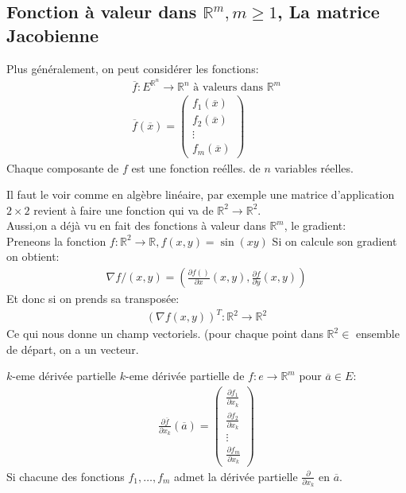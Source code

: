 \subsection{Fonction  à valeur dans $\mathbb{R}^{m}, m \geq 1$, La matrice Jacobienne}

\begin{definition}
	Plus généralement, on peut considérer les fonctions:
	\begin{align*} 
		\overline{f}: E^{\mathbb{R}^{n}} \to \mathbb{R}^{n} \text{ à valeurs dans } \mathbb{R}^{m}\\
		\overline{f}\left(\overline{x}\right) =  \begin{pmatrix} f_1\left(\overline{x}\right) \\ f_2\left(\overline{x}\right) \\ \vdots \\ f_m\left(\overline{x}\right) \end{pmatrix} 
	\end{align*}
	Chaque composante de $f$ est une fonction reélles. de $n$ variables réelles.
\end{definition}
\begin{framedremark}
     Il faut le voir comme en algèbre linéaire, par exemple une matrice d'application $2 \times 2$ revient à faire une fonction qui va de $\mathbb{R}^{2} \to \mathbb{R}^{2}$.\\
     Aussi,on a déjà vu en fait des fonctions à valeur dans $\mathbb{R}^{m}$, le gradient:\\
     Preneons la fonction $f : \mathbb{R}^{2} \to \mathbb{R}, f\left(x, y\right) =  \sin\left(xy\right)$ Si on calcule son gradient on obtient:
     \begin{align*} \nabla f/\left(x, y\right) =  \left(\frac{\partial f\left(\right)}{\partial x} \left(x, y\right), \frac{\partial f}{\partial y} \left(x, y\right)\right) \end{align*}
     Et donc si on prends sa transposée:
     \begin{align*} 
	\left(\nabla f\left(x, y\right)\right)^T : \mathbb{R}^{2} \to \mathbb{R}^{2}
     \end{align*}
     Ce qui nous donne un champ vectoriels. (pour chaque point dans $\mathbb{R}^{2} \in$ ensemble de départ, on a un vecteur.
\end{framedremark}
\begin{parag}{$k$-eme dérivée partielle}
    $k$-eme dérivée partielle de $f : e \to \mathbb{R}^{m}$ pour $\overline{a} \in E$:
    \begin{align*} 
	    \frac{\partial \overline{f}}{\partial x_k} \left(\overline{a}\right) = \begin{pmatrix} \frac{\partial f_1}{\partial x_k}  \\ \frac{\partial f_2}{\partial x_k}  \\ \vdots \\ \frac{\partial f_m}{\partial x_k}  \end{pmatrix} 
    \end{align*}
    Si chacune des fonctions $f_1, \ldots , f_m$ admet la dérivée partielle $\frac{\partial  }{\partial x_k} $ en $\overline{a}$.
\end{parag}
